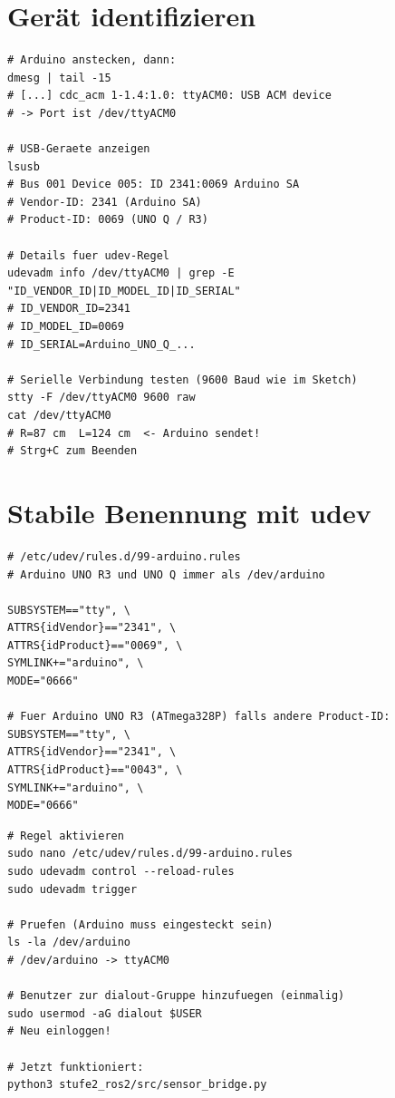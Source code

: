 \section{Gerät identifizieren}

\begin{lstlisting}[style=bash]
# Arduino anstecken, dann:
dmesg | tail -15
# [...] cdc_acm 1-1.4:1.0: ttyACM0: USB ACM device
# -> Port ist /dev/ttyACM0

# USB-Geraete anzeigen
lsusb
# Bus 001 Device 005: ID 2341:0069 Arduino SA
# Vendor-ID: 2341 (Arduino SA)
# Product-ID: 0069 (UNO Q / R3)

# Details fuer udev-Regel
udevadm info /dev/ttyACM0 | grep -E "ID_VENDOR_ID|ID_MODEL_ID|ID_SERIAL"
# ID_VENDOR_ID=2341
# ID_MODEL_ID=0069
# ID_SERIAL=Arduino_UNO_Q_...

# Serielle Verbindung testen (9600 Baud wie im Sketch)
stty -F /dev/ttyACM0 9600 raw
cat /dev/ttyACM0
# R=87 cm  L=124 cm  <- Arduino sendet!
# Strg+C zum Beenden
\end{lstlisting}

\section{Stabile Benennung mit udev}

\begin{lstlisting}[style=text]
# /etc/udev/rules.d/99-arduino.rules
# Arduino UNO R3 und UNO Q immer als /dev/arduino

SUBSYSTEM=="tty", \
ATTRS{idVendor}=="2341", \
ATTRS{idProduct}=="0069", \
SYMLINK+="arduino", \
MODE="0666"

# Fuer Arduino UNO R3 (ATmega328P) falls andere Product-ID:
SUBSYSTEM=="tty", \
ATTRS{idVendor}=="2341", \
ATTRS{idProduct}=="0043", \
SYMLINK+="arduino", \
MODE="0666"
\end{lstlisting}

\begin{lstlisting}[style=bash]
# Regel aktivieren
sudo nano /etc/udev/rules.d/99-arduino.rules
sudo udevadm control --reload-rules
sudo udevadm trigger

# Pruefen (Arduino muss eingesteckt sein)
ls -la /dev/arduino
# /dev/arduino -> ttyACM0

# Benutzer zur dialout-Gruppe hinzufuegen (einmalig)
sudo usermod -aG dialout $USER
# Neu einloggen!

# Jetzt funktioniert:
python3 stufe2_ros2/src/sensor_bridge.py
\end{lstlisting}

